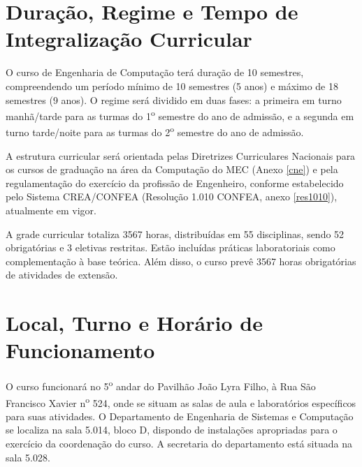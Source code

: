 \section{Duração, Regime e Tempo de Integralização Curricular}

O curso de Engenharia de Computação terá duração de 10 semestres, compreendendo um período mínimo de 10 semestres (5 anos) e máximo de 18 semestres (9 anos). O regime será dividido em duas fases: a primeira em turno manhã/tarde para as turmas do 1\textsuperscript{o} semestre do ano de admissão, e a segunda em turno tarde/noite para as turmas do 2\textsuperscript{o} semestre do ano de admissão.

A estrutura curricular será orientada pelas Diretrizes Curriculares Nacionais para os
cursos de graduação na área da Computação do MEC (Anexo \ref{cne}) e pela regulamentação do exercício da profissão de Engenheiro, conforme estabelecido pelo Sistema CREA/CONFEA (Resolução 1.010 CONFEA, anexo \ref{res1010}), atualmente em vigor.

A grade curricular totaliza 3567 horas, distribuídas em 55 disciplinas, sendo 52 obrigatórias e 3 eletivas restritas. Estão incluídas práticas laboratoriais como complementação à base teórica. Além disso, o curso prevê 3567 horas obrigatórias de atividades de extensão.
  


\section{Local, Turno e Horário de Funcionamento}

O curso funcionará no 5\textsuperscript{o} andar do Pavilhão João Lyra Filho, à Rua São Francisco Xavier n\textsuperscript{o} 524, onde se situam as salas de aula e laboratórios específicos para suas atividades. O Departamento de Engenharia de Sistemas e Computação se localiza na sala 5.014, bloco D, dispondo de instalações apropriadas para o exercício da coordenação do curso. A secretaria do departamento está situada na sala 5.028.

